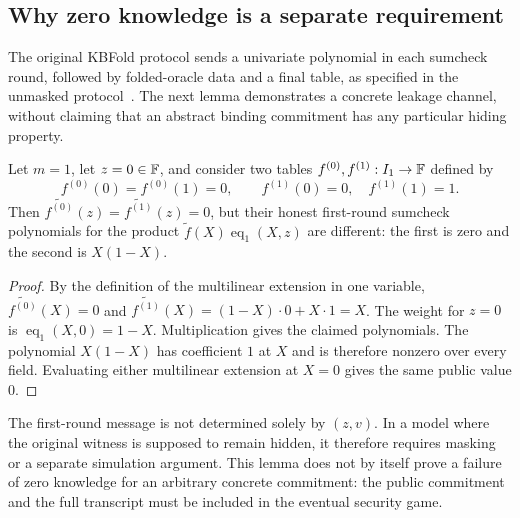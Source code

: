 \subsection{Why zero knowledge is a separate requirement}\label{sec:intro:leakage}

The original KBFold protocol sends a univariate polynomial in each sumcheck round, followed by folded-oracle data and a final table, as specified in the unmasked protocol~\cite{MkhidaKBFold2026}. The next lemma demonstrates a concrete leakage channel, without claiming that an abstract binding commitment has any particular hiding property.

\begin{lemma}\label{lem:intro:leak}
Let $m=1$, let $z=0\in\mathbb{F}$, and consider two tables $f^{(0)},f^{(1)}:I_1\to\mathbb{F}$ defined by
\[
 f^{(0)}(0)=f^{(0)}(1)=0,\qquad f^{(1)}(0)=0,\quad f^{(1)}(1)=1.
\]
Then $\widetilde{f^{(0)}}(z)=\widetilde{f^{(1)}}(z)=0$, but their honest first-round sumcheck polynomials for the product $\widetilde f(X)\operatorname{eq}_1(X,z)$ are different: the first is zero and the second is $X(1-X)$.
\end{lemma}
\begin{proof}
By the definition of the multilinear extension in one variable, $\widetilde{f^{(0)}}(X)=0$ and $\widetilde{f^{(1)}}(X)=(1-X)\cdot0+X\cdot1=X$. The weight for $z=0$ is $\operatorname{eq}_1(X,0)=1-X$. Multiplication gives the claimed polynomials. The polynomial $X(1-X)$ has coefficient $1$ at $X$ and is therefore nonzero over every field. Evaluating either multilinear extension at $X=0$ gives the same public value $0$.
\end{proof}

\begin{remark}
The first-round message is not determined solely by $(z,v)$. In a model where the original witness is supposed to remain hidden, it therefore requires masking or a separate simulation argument. This lemma does not by itself prove a failure of zero knowledge for an arbitrary concrete commitment: the public commitment and the full transcript must be included in the eventual security game.
\end{remark}

